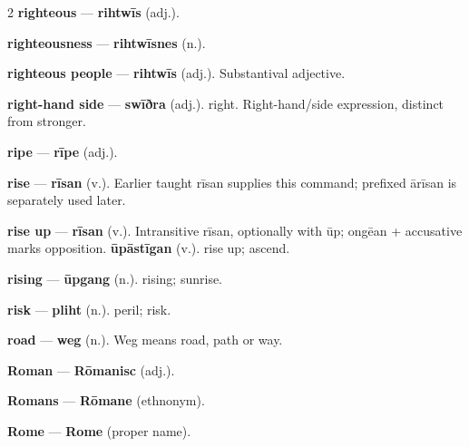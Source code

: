 \begin{multicols}{2}
\textbf{righteous} — \textbf{rihtwīs} (adj.).\par
\textbf{righteousness} — \textbf{rihtwīsnes} (n.).\par
\textbf{righteous people} — \textbf{rihtwīs} (adj.). Substantival adjective.\par
\textbf{right-hand side} — \textbf{swīðra} (adj.). right. Right-hand/side expression, distinct from stronger.\par
\textbf{ripe} — \textbf{rīpe} (adj.).\par
\textbf{rise} — \textbf{rīsan} (v.). Earlier taught rīsan supplies this command; prefixed ārīsan is separately used later.\par
\textbf{rise up} — \textbf{rīsan} (v.). Intransitive rīsan, optionally with ūp; ongēan + accusative marks opposition. \textbf{ūpāstīgan} (v.). rise up; ascend.\par
\textbf{rising} — \textbf{ūpgang} (n.). rising; sunrise.\par
\textbf{risk} — \textbf{pliht} (n.). peril; risk.\par
\textbf{road} — \textbf{weg} (n.). Weg means road, path or way.\par
\textbf{Roman} — \textbf{Rōmanisc} (adj.).\par
\textbf{Romans} — \textbf{Rōmane} (ethnonym).\par
\textbf{Rome} — \textbf{Rome} (proper name).\par

\end{multicols}

